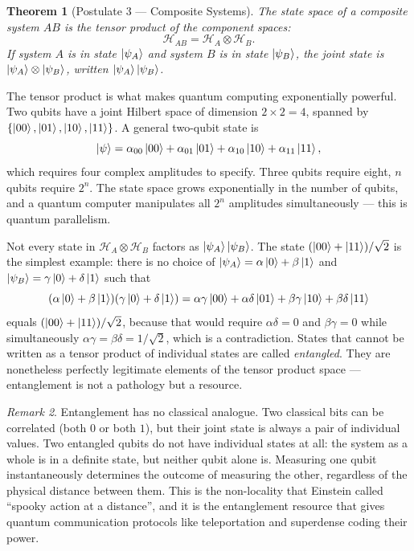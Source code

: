 \documentclass[12pt, a4paper, oneside]{report}
\theoremstyle{plain}
\newtheorem{theorem}{Theorem}[chapter]
\theoremstyle{definition}
\theoremstyle{remark}
\newtheorem{remark}[theorem]{Remark}
\newcommand{\Hcal}{\mathcal{H}}
\begin{document}
\begin{theorem}[Postulate 3 --- Composite Systems]
	\label{post:composite}
	The state space of a composite system $AB$ is the tensor product of the component spaces:
	\[
		\Hcal_{AB} = \Hcal_A \otimes \Hcal_B.
	\]
	If system $A$ is in state $\ket{\psi_A}$ and system $B$ is in state $\ket{\psi_B}$,
	the joint state is $\ket{\psi_A} \otimes \ket{\psi_B}$, written $\ket{\psi_A}\ket{\psi_B}$.
\end{theorem}

The tensor product is what makes quantum computing exponentially powerful. Two qubits have a
joint Hilbert space of dimension $2 \times 2 = 4$, spanned by $\{\ket{00}, \ket{01},
	\ket{10}, \ket{11}\}$. A general two-qubit state is
\[
	\ket{\psi} = \alpha_{00}\ket{00} + \alpha_{01}\ket{01} + \alpha_{10}\ket{10} + \alpha_{11}\ket{11},
\]
which requires four complex amplitudes to specify. Three qubits require eight, $n$ qubits
require $2^n$. The state space grows exponentially in the number of qubits, and a quantum
computer manipulates all $2^n$ amplitudes simultaneously --- this is quantum parallelism.

Not every state in $\Hcal_A \otimes \Hcal_B$ factors as $\ket{\psi_A}\ket{\psi_B}$. The
state $(\ket{00} + \ket{11})/\sqrt{2}$ is the simplest example: there is no choice of
$\ket{\psi_A} = \alpha\ket{0} + \beta\ket{1}$ and $\ket{\psi_B} = \gamma\ket{0} +
	\delta\ket{1}$ such that
\[
	(\alpha\ket{0}+\beta\ket{1})(\gamma\ket{0}+\delta\ket{1})
	= \alpha\gamma\ket{00} + \alpha\delta\ket{01} + \beta\gamma\ket{10} + \beta\delta\ket{11}
\]
equals $(\ket{00}+\ket{11})/\sqrt{2}$, because that would require $\alpha\delta = 0$ and
$\beta\gamma = 0$ while simultaneously $\alpha\gamma = \beta\delta = 1/\sqrt{2}$, which is
a contradiction. States that cannot be written as a tensor product of individual states are
called \emph{entangled}. They are nonetheless perfectly legitimate elements of the tensor
product space --- entanglement is not a pathology but a resource.

\begin{remark}
	Entanglement has no classical analogue. Two classical bits can be correlated (both $0$ or
	both $1$), but their joint state is always a pair of individual values. Two entangled qubits
	do not have individual states at all: the system as a whole is in a definite state, but
	neither qubit alone is. Measuring one qubit instantaneously determines the outcome of
	measuring the other, regardless of the physical distance between them. This is the
	non-locality that Einstein called ``spooky action at a distance'', and it is the entanglement
	resource that gives quantum communication protocols like teleportation and superdense coding
	their power.
\end{remark}
\end{document}

